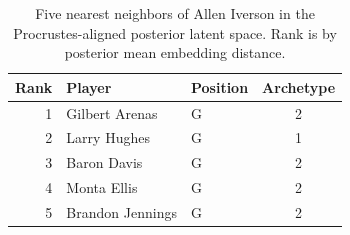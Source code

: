 \begin{table}[htbp]
  \centering\small
  \begin{tabular}{rllc}
    \toprule
    Rank & Player & Position & Archetype \\
    \midrule
    1 & Gilbert Arenas & G & 2 \\
    2 & Larry Hughes & G & 1 \\
    3 & Baron Davis & G & 2 \\
    4 & Monta Ellis & G & 2 \\
    5 & Brandon Jennings & G & 2 \\
    \bottomrule
  \end{tabular}
  \caption{Five nearest neighbors of Allen Iverson in the Procrustes-aligned posterior latent space. Rank is by posterior mean embedding distance.}
  \label{tab:Allen_Iverson_neighbors}
\end{table}

